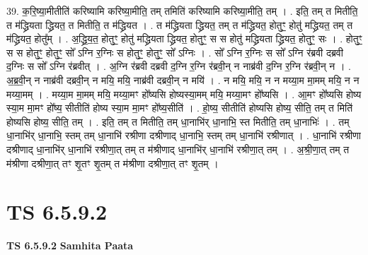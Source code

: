\documentclass[17pt]{extarticle}
\begin{document}
39. क॒रि॒ष्या॒मीतीति॑ करिष्यामि करिष्या॒मीति॒ तम् तमिति॑ करिष्यामि करिष्या॒मीति॒ तम् । . इति॒ तम् त मितीति॒ त म॑द्ध्रियता द्ध्रियत॒ त मितीति॒ त म॑द्ध्रियत । . त म॑द्ध्रियता द्ध्रियत॒ तम् त म॑द्ध्रियत॒ होतुꣳ॒॒ होतु॑ मद्ध्रियत॒ तम् त म॑द्ध्रियत॒ होतु᳚म् । . अ॒द्ध्रि॒य॒त॒ होतुꣳ॒॒ होतु॑ मद्ध्रियता द्ध्रियत॒ होतुꣳ॒॒ स स होतु॑ मद्ध्रियता द्ध्रियत॒ होतुꣳ॒॒ सः । . होतुꣳ॒॒ स स होतुꣳ॒॒ होतुꣳ॒॒ सो᳚ ऽग्नि र॒ग्निः स होतुꣳ॒॒ होतुꣳ॒॒ सो᳚ ऽग्निः । . सो᳚ ऽग्नि र॒ग्निः स सो᳚ ऽग्नि र॑ब्रवी दब्रवी द॒ग्निः स सो᳚ ऽग्नि र॑ब्रवीत् । . अ॒ग्नि र॑ब्रवी दब्रवी द॒ग्नि र॒ग्नि र॑ब्रवी॒न् न नाब्र॑वी द॒ग्नि र॒ग्नि र॑ब्रवी॒न् न । . अ॒ब्र॒वी॒न् न नाब्र॑वी दब्रवी॒न् न मयि॒ मयि॒ नाब्र॑वी दब्रवी॒न् न मयि॑ । . न मयि॒ मयि॒ न न मय्या॒म मा॒मम् मयि॒ न न मय्या॒मम् । . मय्या॒म मा॒मम् मयि॒ मय्या॒मꣳ हो᳚ष्यसि होष्यस्या॒मम् मयि॒ मय्या॒मꣳ हो᳚ष्यसि । . आ॒मꣳ हो᳚ष्यसि होष्य स्या॒म मा॒मꣳ हो᳚ष्य॒ सीतीति॑ होष्य स्या॒म मा॒मꣳ हो᳚ष्य॒सीति॑ । . हो॒ष्य॒ सीतीति॑ होष्यसि होष्य॒ सीति॒ तम् त मिति॑ होष्यसि होष्य॒ सीति॒ तम् । . इति॒ तम् त मितीति॒ तम् धा॒नाभि॑र् धा॒नाभि॒ स्त मितीति॒ तम् धा॒नाभिः॑ । . तम् धा॒नाभि॑र् धा॒नाभि॒ स्तम् तम् धा॒नाभि॑ रश्रीणा दश्रीणाद् धा॒नाभि॒ स्तम् तम् धा॒नाभि॑ रश्रीणात् । . धा॒नाभि॑ रश्रीणा दश्रीणाद् धा॒नाभि॑र् धा॒नाभि॑ रश्रीणा॒त् तम् त म॑श्रीणाद् धा॒नाभि॑र् धा॒नाभि॑ रश्रीणा॒त् तम् । . अ॒श्री॒णा॒त् तम् त म॑श्रीणा दश्रीणा॒त् तꣳ शृ॒तꣳ शृ॒तम् त म॑श्रीणा दश्रीणा॒त् तꣳ शृ॒तम् । \newline
\pagebreak
{}

\section{ TS 6.5.9.2 }

\textbf{TS 6.5.9.2 } \newline
\textbf{Samhita Paata} \newline
\end{document}

